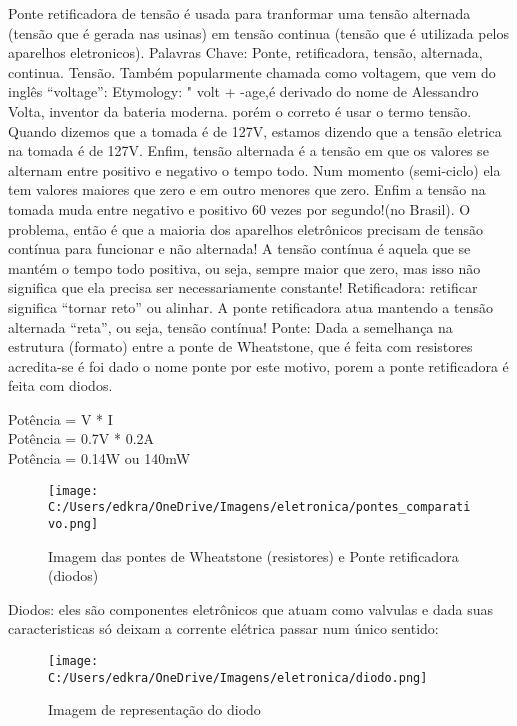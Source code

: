 \documentclass[a4paper,12pt]{article}
\begin{document}
\noindent
Ponte retificadora de tensão é usada para tranformar uma tensão alternada (tensão que é gerada nas usinas) em tensão continua (tensão que é utilizada pelos aparelhos eletronicos).
\noindent
Palavras Chave: Ponte, retificadora, tensão, alternada, continua.
\noindent
Tensão. Também popularmente chamada como voltagem, que vem do inglês “voltage”:
Etymology:
" volt + -age,é derivado do nome de Alessandro Volta, inventor da bateria moderna. porém o correto é usar o termo tensão. Quando dizemos que a tomada é de 127V, estamos dizendo que a tensão eletrica na tomada é de 127V.
\noindent
Enfim, tensão alternada é a tensão em que os valores se alternam entre positivo e negativo o tempo todo. Num momento (semi-ciclo) ela tem  valores maiores que zero e em outro menores que zero. Enfim a tensão na tomada muda entre negativo e positivo 60 vezes por segundo!(no Brasil).
\noindent
O problema, então é que a maioria dos aparelhos eletrônicos precisam de tensão contínua para funcionar e não alternada! A tensão contínua é aquela que se mantém o tempo todo positiva, ou seja, sempre maior que zero, mas isso não significa que ela precisa ser necessariamente constante!
\noindent
Retificadora: retificar significa “tornar reto” ou alinhar.  
\noindent
A ponte retificadora atua mantendo a tensão alternada “reta”, ou seja, tensão contínua!
\noindent
Ponte: Dada a semelhança na estrutura (formato) entre a ponte de Wheatstone, que é feita com resistores acredita-se é foi dado o nome ponte por este motivo, porem a ponte retificadora é feita com diodos.

\begin{center}
\noindent
Potência = V * I\\
Potência = 0.7V * 0.2A\\
Potência = 0.14W ou 140mW
\end{center}

\begin{figure}[h]
\centering
\texttt{[image: C:/Users/edkra/OneDrive/Imagens/eletronica/pontes\_comparativo.png]}
	\label{Comparativo_pontes}
	\caption{Imagem das pontes de Wheatstone (resistores) e Ponte retificadora (diodos)}	
\end{figure}
\newpage
\noindent
Diodos: eles são componentes eletrônicos que atuam como valvulas  e dada suas caracteristicas só deixam a corrente elétrica passar num único sentido:
\vspace{.07cm}

\begin{figure}[h]
\centering
	\texttt{[image: C:/Users/edkra/OneDrive/Imagens/eletronica/diodo.png]}
	\label{ConduçãoDiodo}
	\caption{Imagem de representação do diodo}	
\end{figure}
\end{document}
